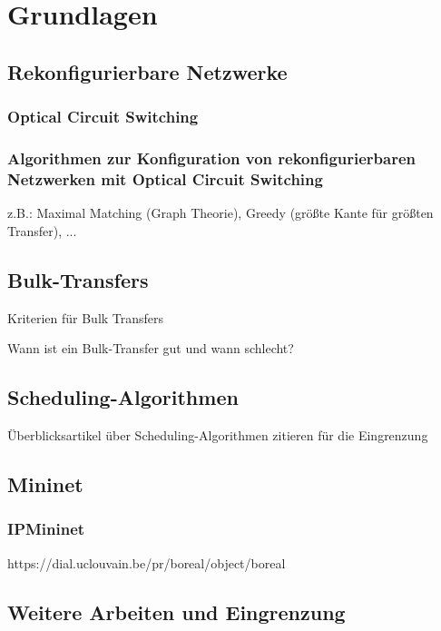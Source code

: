 \chapter{Grundlagen}

\section{Rekonfigurierbare Netzwerke}

\subsection{Optical Circuit Switching}

\subsection{Algorithmen zur Konfiguration von rekonfigurierbaren Netzwerken mit Optical Circuit Switching}

z.B.: Maximal Matching (Graph Theorie), Greedy (größte Kante für größten Transfer), ...

\section{Bulk-Transfers}

Kriterien für Bulk Transfers

Wann ist ein Bulk-Transfer gut und wann schlecht?

\section{Scheduling-Algorithmen}

Überblicksartikel über Scheduling-Algorithmen zitieren für die Eingrenzung

\section{Mininet}

\subsection{IPMininet}

https://dial.uclouvain.be/pr/boreal/object/boreal%

\section{Weitere Arbeiten und Eingrenzung}